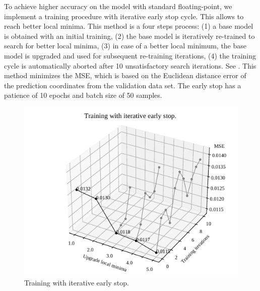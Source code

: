 To achieve higher accuracy on the model with standard floating-point, we implement a training procedure with iterative early stop cycle. This allows to reach better local minima. This method is a four steps process: (1) a base model is obtained with an initial training, (2) the base model is iteratively re-trained to search for better local minima, (3) in case of a better local minimum, the base model is upgraded and used for subsequent re-training iterations, (4) the training cycle is automatically aborted after 10 unsatisfactory search iterations. See . This method minimizes the MSE, which is based on the Euclidean distance error of the prediction coordinates from the validation data set. The early stop has a patience of 10 epochs and batch size of 50 samples.

\begin{figure}[h!]
	\centering
	\includegraphics[width=\columnwidth]{../figures/histograms/optimization.pdf}
	\caption{Training with iterative early stop.}
	\label{fig:optimization}
\end{figure}

